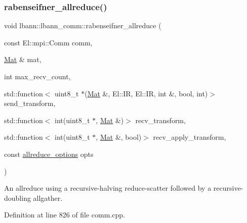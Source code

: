 \mbox{\label{classlbann_1_1lbann__comm_a925fcf1c15cb8ff10daed1dc1faed9ac}} 
\subsubsection{\texorpdfstring{rabenseifner\+\_\+allreduce()}{rabenseifner\_allreduce()}}
{\footnotesize\ttfamily void lbann\+::lbann\+\_\+comm\+::rabenseifner\+\_\+allreduce (\begin{DoxyParamCaption}\item[{const El\+::mpi\+::\+Comm}]{comm,  }\item[{\hyperlink{base_8hpp_a68f11fdc31b62516cb310831bbe54d73}{Mat} \&}]{mat,  }\item[{int}]{max\+\_\+recv\+\_\+count,  }\item[{std\+::function$<$ uint8\+\_\+t $\ast$(\hyperlink{base_8hpp_a68f11fdc31b62516cb310831bbe54d73}{Mat} \&, El\+::\+IR, El\+::\+IR, int \&, bool, int)$>$}]{send\+\_\+transform,  }\item[{std\+::function$<$ int(uint8\+\_\+t $\ast$, \hyperlink{base_8hpp_a68f11fdc31b62516cb310831bbe54d73}{Mat} \&)$>$}]{recv\+\_\+transform,  }\item[{std\+::function$<$ int(uint8\+\_\+t $\ast$, \hyperlink{base_8hpp_a68f11fdc31b62516cb310831bbe54d73}{Mat} \&, bool)$>$}]{recv\+\_\+apply\+\_\+transform,  }\item[{const \hyperlink{structlbann_1_1lbann__comm_1_1allreduce__options}{allreduce\+\_\+options}}]{opts }\end{DoxyParamCaption})}

An allreduce using a recursive-\/halving reduce-\/scatter followed by a recursive-\/doubling allgather. 

Definition at line 826 of file comm.\+cpp.


